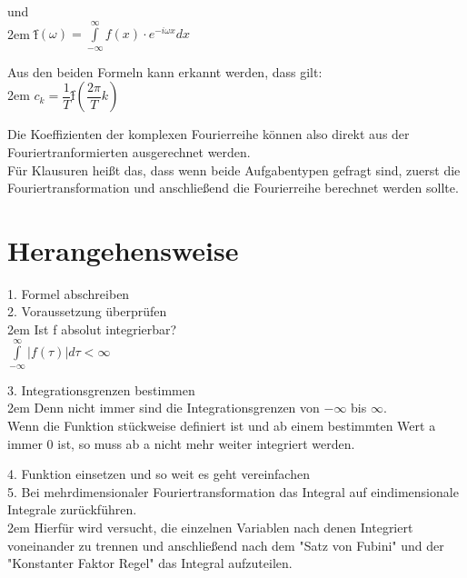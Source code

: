 \documentclass[11pt,final]{scrreprt}
\newcommand{\br} {\medskip\\}
\begin{document}
und\\

\begingroup
\leftskip2em 
\^{f}$(\omega) = \int\limits_{-\infty}^{\infty} f(x) \cdot e^{-i\omega x } dx $\\
\par	
\endgroup 

Aus den beiden Formeln kann erkannt werden, dass gilt:\\

\begingroup
\leftskip2em 
$c_k = \dfrac{1}{T}$\^{f}$(\dfrac{2\pi}{T} k) $\\
\par	
\endgroup 

Die Koeffizienten der komplexen Fourierreihe können also direkt aus der Fouriertranformierten ausgerechnet werden.\\
Für Klausuren heißt das, dass wenn beide Aufgabentypen gefragt sind, zuerst die Fouriertransformation und anschließend die Fourierreihe berechnet werden sollte.\\
\newpage
\section{Herangehensweise}

1. Formel abschreiben\br

2. Voraussetzung überprüfen\\

\begingroup
\leftskip2em 
Ist f absolut integrierbar?\\
$ \int\limits_{-\infty}^{\infty} |{f(\tau)}| d\tau < \infty $\\
\par
\endgroup 

3. Integrationsgrenzen bestimmen\\

\begingroup
\leftskip2em 
Denn nicht immer sind die Integrationsgrenzen von $-\infty$ bis $\infty$.\\
Wenn die Funktion stückweise definiert ist und ab einem bestimmten Wert a immer 0 ist, so muss ab a nicht mehr weiter integriert werden.\\
\par
\endgroup 

4. Funktion einsetzen und so weit es geht vereinfachen\br

5. Bei mehrdimensionaler Fouriertransformation das Integral auf eindimensionale Integrale zurückführen.\\

\begingroup
\leftskip2em 
Hierfür wird versucht, die einzelnen Variablen nach denen Integriert voneinander zu trennen und anschließend nach dem "Satz von Fubini" und der "Konstanter Faktor Regel" das Integral aufzuteilen.\\
\par	
\endgroup 
\end{document}
